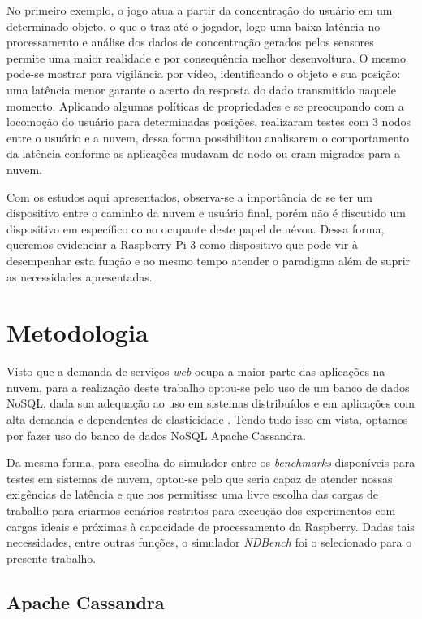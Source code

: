 \documentclass[12pt,english,brazil]{article}
\begin{document}
No primeiro exemplo, o jogo atua a partir da concentração do usuário em um determinado objeto, o que o traz até o jogador, logo uma baixa latência no processamento e análise dos dados de concentração gerados pelos sensores permite uma maior realidade e por consequência melhor desenvoltura. O mesmo pode-se mostrar para vigilância por vídeo, identificando o objeto e sua posição: uma latência menor garante o acerto da resposta do dado transmitido naquele momento. Aplicando algumas políticas de propriedades e se preocupando com a locomoção do usuário para determinadas posições, realizaram testes com 3 nodos entre o usuário e a nuvem, dessa forma possibilitou analisarem o comportamento da latência conforme as aplicações mudavam de nodo ou eram migrados para a nuvem. 

Com os estudos aqui apresentados, observa-se a importância de se ter um dispositivo entre o caminho da nuvem e usuário final, porém não é discutido um dispositivo em específico como ocupante deste papel de névoa. Dessa forma, queremos evidenciar a Raspberry Pi 3 como dispositivo que pode vir à desempenhar esta função e ao mesmo tempo atender o paradigma além de suprir as necessidades apresentadas.

\section{Metodologia} \label{sec:metodologia}

Visto que a demanda de serviços \textit{web} ocupa a maior parte das aplicações na nuvem, para a realização deste trabalho optou-se pelo uso de um banco de dados NoSQL, dada sua adequação ao uso em sistemas distribuídos e em aplicações com alta demanda e dependentes de elasticidade \cite{cattell2011scalable}. Tendo tudo isso em vista, optamos por fazer uso do banco de dados NoSQL Apache Cassandra.

Da mesma forma, para escolha do simulador entre os \textit{benchmarks} disponíveis para testes em sistemas de nuvem, optou-se pelo que seria capaz de atender nossas exigências de latência e que nos permitisse uma livre escolha das cargas de trabalho para criarmos cenários restritos para execução dos experimentos com cargas ideais e próximas à capacidade de processamento da Raspberry. Dadas tais necessidades, entre outras funções, o simulador \textit{NDBench} foi o selecionado para o presente trabalho. 

\subsection{Apache Cassandra} \label{sec:Cassandra}
\end{document}
